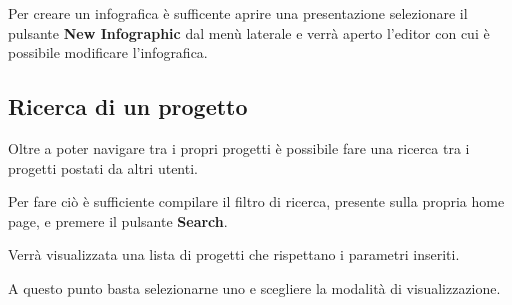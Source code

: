 Per creare un infografica è sufficente aprire una presentazione selezionare il pulsante \textbf{New Infographic} dal menù laterale e verrà aperto l'editor con cui è possibile modificare l'infografica.

\subsection{Ricerca di un progetto}

Oltre a poter navigare tra i propri progetti è possibile fare una ricerca tra i progetti postati da altri utenti.

\noindent Per fare ciò è sufficiente compilare il filtro di ricerca, presente sulla propria home page, e premere il pulsante \textbf{Search}.


Verrà visualizzata una lista di progetti che rispettano i parametri inseriti.


\noindent A questo punto basta selezionarne uno e scegliere la modalità di visualizzazione.